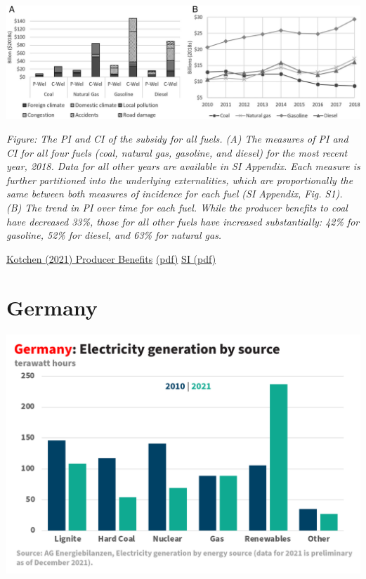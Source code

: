 \documentclass[
]{book}
\begin{document}
\includegraphics{fig/fossil_subsidy_2.jpg}

\emph{Figure: The PI and CI of the subsidy for all fuels. (A) The measures of PI and CI for all four fuels (coal, natural gas, gasoline, and diesel) for the most recent year, 2018. Data for all other years are available in SI Appendix. Each measure is further partitioned into the underlying externalities, which are proportionally the same between both measures of incidence for each fuel (SI Appendix, Fig. S1). (B) The trend in PI over time for each fuel. While the producer benefits to coal have decreased 33\%, those for all other fuels have increased substantially: 42\% for gasoline, 52\% for diesel, and 63\% for natural gas.}

\href{https://www.pnas.org/content/118/14/e2011969118}{Kotchen (2021) Producer Benefits}
\href{pdf/Kotchen_2021_Fossil_Subsidies.pdf}{(pdf)}
\href{pdf/Kotchen_2021_Fossil_Subsidies_SI.pdf}{SI (pdf)}

\hypertarget{germany}{%
\chapter{Germany}\label{germany}}

\includegraphics{fig/Germany_2010_2021_Electricty_by_Source.png}
\end{document}
